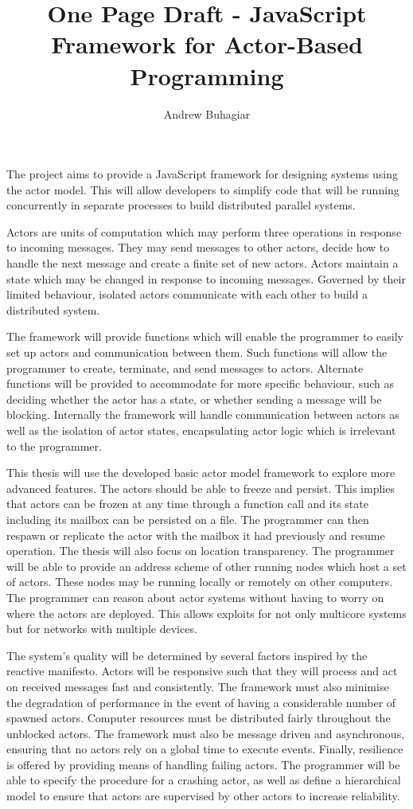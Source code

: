 \documentclass[12pt]{report}
\author{Andrew Buhagiar}
\title{One Page Draft - JavaScript Framework for Actor-Based Programming}
\begin{document}
\maketitle
The project aims to provide a JavaScript framework for designing systems using the actor model. This will allow developers to simplify code that will be running concurrently in separate processes to build distributed parallel systems.

Actors are units of computation which may perform three operations in response to incoming messages\cite{agha_1986}. They may send messages to other actors, decide how to handle the next message and create a finite set of new actors. Actors maintain a state which may be changed in response to incoming messages. Governed by their limited behaviour, isolated actors communicate with each other to build a distributed system.

The framework will provide functions which will enable the programmer to easily set up actors and communication between them. Such functions will allow the programmer to create, terminate, and send messages to actors. Alternate functions will be provided to accommodate for more specific behaviour, such as deciding whether the actor has a state, or whether sending a message will be blocking. Internally the framework will handle communication between actors as well as the isolation of actor states, encapsulating actor logic which is irrelevant to the programmer. 

This thesis will use the developed basic actor model framework to explore more advanced features. The actors should be able to freeze and persist. This implies that actors can be frozen at any time through a function call and its state including its mailbox can be persisted on a file. The programmer can then respawn or replicate the actor with the mailbox it had previously and resume operation. The thesis will also focus on location transparency. The programmer will be able to provide an address scheme of other running nodes which host a set of actors. These nodes may be running locally or remotely on other computers. The programmer can reason about actor systems without having to worry on where the actors are deployed. This allows exploits for not only multicore systems but for networks with multiple devices.

The system’s quality will be determined by several factors inspired by the reactive manifesto\cite{reactivemanifesto}. Actors will be responsive such that they will process and act on received messages fast and consistently. The framework must also minimise the degradation of performance in the event of having a considerable number of spawned actors. Computer resources must be distributed fairly throughout the unblocked actors. The framework must also be message driven and asynchronous, ensuring that no actors rely on a global time to execute events. Finally, resilience is offered by providing means of handling failing actors. The programmer will be able to specify the procedure for a crashing actor, as well as define a hierarchical model to ensure that actors are supervised by other actors to increase reliability.


\end{document}
